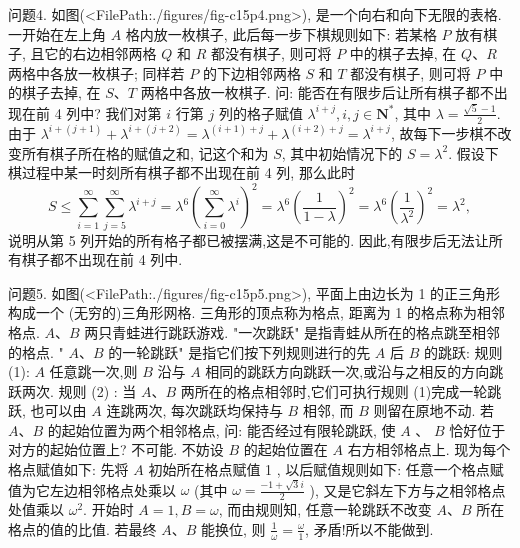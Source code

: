 问题4. 如图(<FilePath:./figures/fig-c15p4.png>), 是一个向右和向下无限的表格.
一开始在左上角 $A$ 格内放一枚棋子, 此后每一步下棋规则如下: 若某格 $P$ 放有棋子, 且它的右边相邻两格 $Q$ 和 $R$ 都没有棋子, 则可将 $P$ 中的棋子去掉, 在 $Q 、 R$ 两格中各放一枚棋子; 同样若 $P$ 的下边相邻两格 $S$ 和 $T$ 都没有棋子, 则可将 $P$ 中的棋子去掉, 在 $S 、 T$ 两格中各放一枚棋子.
问: 能否在有限步后让所有棋子都不出现在前 4 列中?
我们对第 $i$ 行第 $j$ 列的格子赋值 $\lambda^{i+j}, i, j \in \mathbf{N}^*$, 其中 $\lambda=\frac{\sqrt{5}-1}{2}$.
由于 $\lambda^{i+(j+1)}+\lambda^{i+(j+2)}=\lambda^{(i+1)+j}+\lambda^{(i+2)+j}=\lambda^{i+j}$, 故每下一步棋不改变所有棋子所在格的赋值之和, 记这个和为 $S$, 其中初始情况下的 $S=\lambda^2$.
假设下棋过程中某一时刻所有棋子都不出现在前 4 列, 那么此时
$$
S \leqslant \sum_{i=1}^{\infty} \sum_{j=5}^{\infty} \lambda^{i+j}=\lambda^6\left(\sum_{i=0}^{\infty} \lambda^i\right)^2=\lambda^6\left(\frac{1}{1-\lambda}\right)^2=\lambda^6\left(\frac{1}{\lambda^2}\right)^2=\lambda^2,
$$
说明从第 5 列开始的所有格子都已被摆满,这是不可能的.
因此,有限步后无法让所有棋子都不出现在前 4 列中.



问题5. 如图(<FilePath:./figures/fig-c15p5.png>), 平面上由边长为 1 的正三角形构成一个 (无穷的)三角形网格.
三角形的顶点称为格点, 距离为 1 的格点称为相邻格点.
$A 、 B$ 两只青蛙进行跳跃游戏.
"一次跳跃" 是指青蛙从所在的格点跳至相邻的格点.
" $A 、 B$ 的一轮跳跃" 是指它们按下列规则进行的先 $A$ 后 $B$ 的跳跃:
规则(1): $A$ 任意跳一次,则 $B$ 沿与 $A$ 相同的跳跃方向跳跃一次,或沿与之相反的方向跳跃两次.
规则 (2) : 当 $A 、 B$ 两所在的格点相邻时,它们可执行规则 (1)完成一轮跳跃, 也可以由 $A$ 连跳两次, 每次跳跃均保持与 $B$ 相邻, 而 $B$ 则留在原地不动.
若 $A 、 B$ 的起始位置为两个相邻格点, 问: 能否经过有限轮跳跃, 使 $A$ 、 $B$ 恰好位于对方的起始位置上?
不可能.
不妨设 $B$ 的起始位置在 $A$ 右方相邻格点上.
现为每个格点赋值如下:
先将 $A$ 初始所在格点赋值 1 , 以后赋值规则如下: 任意一个格点赋值为它左边相邻格点处乘以 $\omega$ (其中 $\omega=\frac{-1+\sqrt{3} i}{2}$ ), 又是它斜左下方与之相邻格点处值乘以 $\omega^2$.
开始时 $A=1, B=\omega$, 而由规则知, 任意一轮跳跃不改变 $A 、 B$ 所在格点的值的比值.
若最终 $A 、 B$ 能换位, 则 $\frac{1}{\omega}=\frac{\omega}{1}$, 矛盾!所以不能做到.



